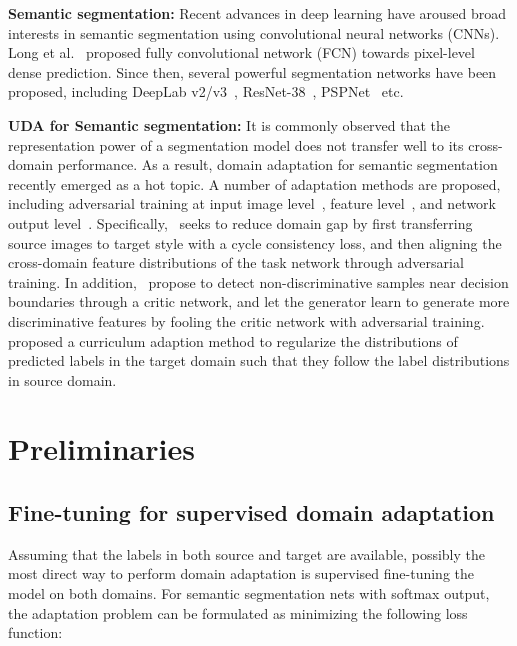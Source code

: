 \documentclass[runningheads]{llncs}
\begin{document}
\noindent\textbf{Semantic segmentation:} Recent advances in deep learning have aroused broad interests in semantic segmentation using convolutional neural networks (CNNs). Long et al.~\cite{long2015fully} proposed fully convolutional network (FCN) towards pixel-level dense prediction. Since then, several powerful segmentation networks have been proposed, including DeepLab v2/v3~\cite{chen2018deeplab, chen2017rethinking}, ResNet-38~\cite{wu2016wider}, PSPNet~\cite{Zhao_2017_CVPR} etc.

\noindent\textbf{UDA for Semantic segmentation:} It is commonly observed that the representation power of a segmentation model does not transfer well to its cross-domain performance. As a result, domain adaptation for semantic segmentation recently emerged as a hot topic. A number of adaptation methods are proposed, including adversarial training at input image level~\cite{hoffman2018cycada}, feature level~\cite{hoffman2016fcns,Chen_2017_ICCV,hoffman2018cycada}, and network output level~\cite{tsai2018learning}. Specifically,~\cite{hoffman2018cycada} seeks to reduce domain gap by first transferring source images to target style with a cycle consistency loss, and then aligning the cross-domain feature distributions of the task network through adversarial training. In addition,~\cite{saito2017adversarial} propose to detect non-discriminative samples near decision boundaries through a critic network, and let the generator learn to generate more discriminative features by fooling the critic network with adversarial training. \cite{Zhang_2017_ICCV} proposed a curriculum adaption method to regularize the distributions of predicted labels in the target domain such that they follow the label distributions in source domain. 



\section{Preliminaries}
\subsection{Fine-tuning for supervised domain adaptation}
Assuming that the labels in both source and target are available, possibly the most direct way to perform domain adaptation is supervised fine-tuning the model on both domains. For semantic segmentation nets with softmax output, the adaptation problem can be formulated as minimizing the following loss function:
\end{document}
